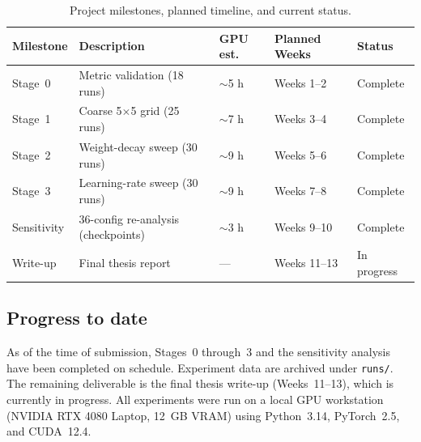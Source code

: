 \documentclass[12pt,openany,a4paper]{book}
\begin{document}
\begin{table}[htbp]
  \centering
  \caption{Project milestones, planned timeline, and current status.}
  \label{tab:milestones}
  \renewcommand{\arraystretch}{1.2}
  \begin{tabular}{lllll}
    \toprule
    Milestone & Description & GPU est. & Planned Weeks & Status \\
    \midrule
    Stage~0 & Metric validation (18 runs) & $\sim$5 h & Weeks 1--2 & Complete \\
    Stage~1 & Coarse 5$\times$5 grid (25 runs) & $\sim$7 h & Weeks 3--4 & Complete \\
    Stage~2 & Weight-decay sweep (30 runs) & $\sim$9 h & Weeks 5--6 & Complete \\
    Stage~3 & Learning-rate sweep (30 runs) & $\sim$9 h & Weeks 7--8 & Complete \\
    Sensitivity & 36-config re-analysis (checkpoints) & $\sim$3 h & Weeks 9--10 & Complete \\
    Write-up  & Final thesis report & --- & Weeks 11--13 & In progress \\
    \bottomrule
  \end{tabular}
\end{table}

\subsection{Progress to date}

As of the time of submission, Stages~0 through~3 and the sensitivity
analysis have been completed on schedule.
Experiment data are archived under \texttt{runs/}.
The remaining deliverable is the final thesis write-up (Weeks~11--13),
which is currently in progress.
All experiments were run on a local GPU workstation
(NVIDIA RTX 4080 Laptop, 12~GB VRAM) using
Python~3.14, PyTorch~2.5, and CUDA~12.4.
\end{document}
